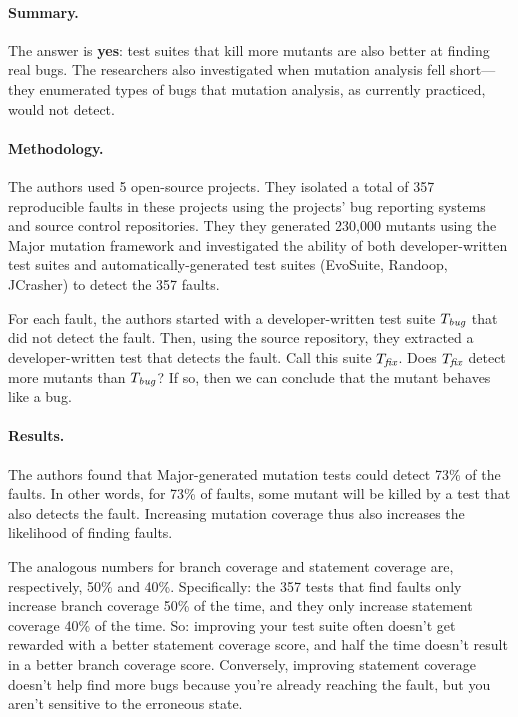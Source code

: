 \documentclass[11pt]{article}
\begin{document}
\paragraph{Summary.} The answer is {\bf yes}: test suites
that kill more mutants are also better at finding real bugs. The
researchers also investigated when mutation analysis fell short---they
enumerated types of bugs that mutation analysis, as currently
practiced, would not detect.

\paragraph{Methodology.} The authors used 5 open-source projects.
They isolated a total of 357 reproducible faults in these projects
using the projects' bug reporting systems and source control
repositories. They they generated 230,000 mutants using the
Major mutation framework and investigated the ability of
both developer-written test suites and automatically-generated
test suites (EvoSuite, Randoop, JCrasher) to detect the 357 faults.

For each fault, the authors started with a developer-written test
suite $T_{\mbox{\em \scriptsize bug}}$ that did not detect the fault. Then, using
the source repository, they extracted a developer-written test that
detects the fault. Call this suite $T_{\mbox{\em \scriptsize fix}}$. Does
$T_{\mbox{\em \scriptsize fix}}$ detect more mutants than $T_{\mbox{\em \scriptsize bug}}$?
If so, then we can conclude that the mutant behaves like a bug.

\paragraph{Results.} The authors found that Major-generated mutation
tests could detect 73\% of the faults.  In other words, for 73\% of
faults, some mutant will be killed by a test that also detects the
fault. Increasing mutation coverage thus also increases the likelihood
of finding faults.

The analogous numbers for branch coverage and statement coverage are,
respectively, 50\% and 40\%. Specifically: the 357 tests that find
faults only increase branch coverage 50\% of the time, and they only
increase statement coverage 40\% of the time. So: improving your test
suite often doesn't get rewarded with a better statement coverage
score, and half the time doesn't result in a better branch coverage
score. Conversely, improving statement coverage doesn't help find more bugs because
you're already reaching the fault, but you aren't sensitive to the erroneous state.
\end{document}
